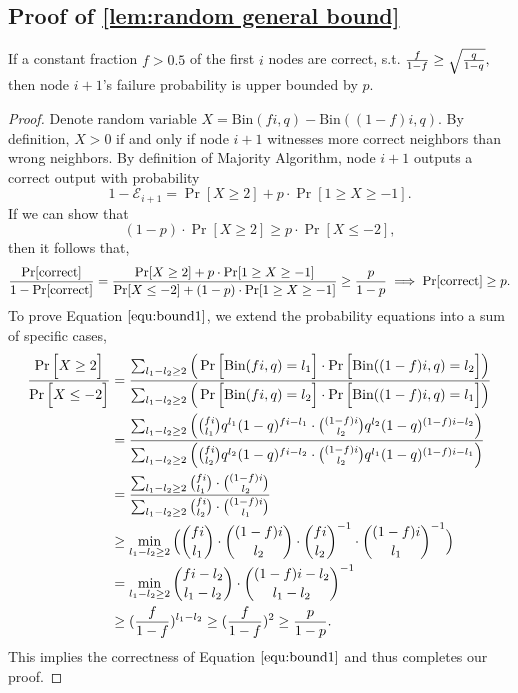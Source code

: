 \documentclass[a4paper,UKenglish]{lipics}
\theoremstyle{definition}
\begin{document}
\subsection{Proof of \ref{lem:random general bound}}
\label{subsec:random general bound}

If a constant fraction $f > 0.5$ of the first $i$ nodes are correct, s.t.
$
	{f\over 1-f} \ge \sqrt{q\over 1-q},
$
then node $i+1$'s failure probability is upper bounded by $p$. 

\begin{proof}
Denote random variable $X = \text{Bin}(fi, q) - \text{Bin}((1-f)i, q)$. 
By definition, $X>0$ if and only if node $i+1$ witnesses more correct neighbors than wrong neighbors.
By definition of Majority Algorithm, node $i+1$ outputs a correct output with probability
\begin{equation*}
	1 - \mathcal{E}_{i+1}
=
	\Pr[ X \ge 2]
	+
	p\cdot \Pr[ 1 \ge X \ge -1].
\end{equation*}
If we can show that 
\begin{equation}
\label{equ:bound1}
	(1-p)\cdot\Pr[ X \ge 2 ] 
	\ge 
	p\cdot\Pr[ X \le -2 ],
\end{equation} 
then it follows that,
\begin{align*}
	{\Pr[\text{correct}]\over 1 - \Pr[\text{correct}]} 
=
	{\Pr[ X \ge 2]+ p\cdot \Pr[ 1 \ge X \ge -1] \over \Pr[ X \le -2]+ (1-p)\cdot \Pr[ 1 \ge X \ge -1]} 
\ge
	{p\over 1-p}
\implies
	\Pr[\text{correct}]
\ge
	p.
\end{align*}
To prove Equation $\eqref{equ:bound1}$, we extend the probability equations into a sum of specific cases,
\begin{align*}
	{\Pr \Big[ X \ge 2 \Big] \over \Pr\Big[ X \le -2 \Big]}
& =
	{\sum_{l_1 - l_2 \ge 2} \Big( \Pr\Big[ \text{Bin}(fi, q) = l_1 \Big]\cdot \Pr\Big[ \text{Bin}((1-f)i, q) = l_2 \Big] \Big)
	\over
	\sum_{l_1 - l_2 \ge 2} \Big( \Pr\Big[ \text{Bin}(fi, q) = l_2 \Big]\cdot \Pr\Big[ \text{Bin}((1-f)i, q) = l_1 \Big] \Big) }
\\
& =
	{\sum_{l_1 - l_2 \ge 2} \Big( {fi\choose l_1} q^{l_1}(1-q)^{fi - l_1}\cdot {(1-f)i\choose l_2} q^{l_2}(1-q)^{(1-f)i - l_2} \Big)
	\over
	\sum_{l_1 - l_2 \ge 2} \Big( {fi\choose l_2} q^{l_2}(1-q)^{fi - l_2}\cdot {(1-f)i\choose l_2} q^{l_1}(1-q)^{(1-f)i - l_1} \Big) }
\\
& =
	{\sum_{l_1 - l_2 \ge 2} {fi\choose l_1} \cdot {(1-f)i\choose l_2} 
	\over
	\sum_{l_1 - l_2 \ge 2} {fi\choose l_2} \cdot {(1-f)i\choose l_1}  }
\\
& \ge
	\min_{l_1 - l_2\ge 2} \Big( {fi\choose l_1} \cdot {(1-f)i\choose l_2}\cdot {fi\choose l_2}^{-1} \cdot {(1-f)i\choose l_1}^{-1} \Big)
\\
& =
	\min_{l_1 - l_2\ge 2} {fi - l_2 \choose l_1 - l_2} \cdot {(1-f)i - l_2 \choose l_1 - l_2}^{-1} \\
& \ge
	({f\over 1-f})^{l_1 - l_2}
	\ge
	({f\over 1-f})^2
	\ge {p\over 1-p}.
\end{align*}
This implies the correctness of Equation $\ref{equ:bound1}$ and thus completes our proof.
\end{proof}
\end{document}
